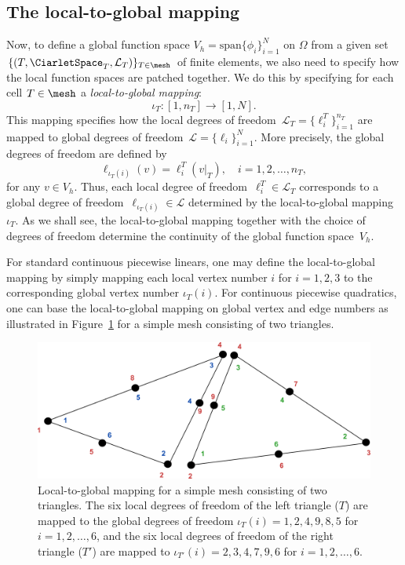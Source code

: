 \subsection{The local-to-global mapping}

Now, to define a global function space $V_h = \mathrm{span}
\{\phi_i\}_{i=1}^N$ on $\Omega$ from a given set $\{(T,
\CiarletSpace_T,\mathcal{L}_T)\}_{T\in\mesh}$ of finite elements, we
also need to specify how the local function spaces are patched
together. We do this by specifying for each cell $T \in \mesh$ a
\emph{local-to-global mapping}:
\begin{equation}
  \iota_T : [1, n_T] \rightarrow [1, N].
\end{equation}
This mapping specifies how the local degrees of freedom~$\mathcal{L}_T =
\{\ell_i^T\}_{i=1}^{n_T}$ are mapped to global degrees of
freedom~$\mathcal{L} = \{\ell_i\}_{i=1}^N$. More precisely, the global
degrees of freedom are defined by
\begin{equation} \label{eq:nodemapping}
  \ell_{\iota_T(i)}(v) = \ell^T_i(v|_T), \quad i = 1,2,\ldots,n_T,
\end{equation}
for any $v\in V_h$. Thus, each local degree of freedom~$\ell^T_i \in
\mathcal{L}_T$ corresponds to a global degree of
freedom~$\ell_{\iota_T(i)} \in \mathcal{L}$ determined by the
local-to-global mapping $\iota_T$. As we shall see, the
local-to-global mapping together with the choice of degrees of freedom
determine the continuity of the global function space~$V_h$.

For standard continuous piecewise linears, one may define the
local-to-global mapping by simply mapping each local vertex number $i$
for $i=1,2,3$ to the corresponding global vertex number
$\iota_T(i)$. For continuous piecewise quadratics, one can base the
local-to-global mapping on global vertex and edge numbers as
illustrated in Figure~\ref{fig:dofmap} for a simple mesh consisting of
two triangles.

\begin{figure}
  \center\includegraphics[width=\largefig]{chapters/kirby-7/pdf/dofmap.pdf}
  \caption{Local-to-global mapping for a simple mesh consisting of
    two triangles. The six local degrees of freedom of the left
    triangle ($T$) are mapped to the global degrees of freedom
    $\iota_T(i) = 1, 2, 4, 9, 8, 5$ for $i = 1, 2, \ldots, 6$, and
    the six local degrees of freedom of the right triangle ($T'$)
    are mapped to $\iota_{T'}(i) = 2, 3, 4, 7, 9, 6$ for $i = 1, 2,
    \ldots, 6$.}
  \label{fig:dofmap}
\end{figure}

